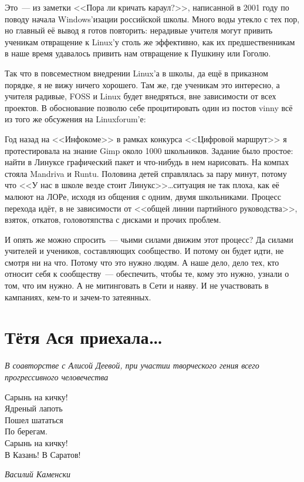 Это~--- из заметки <<Пора ли кричать караул?>>, написанной в 2001 году по поводу начала Windows'изации российской школы. Много воды утекло с тех пор, но главный её вывод я готов повторить: нерадивые учителя могут привить ученикам отвращение к Linux'у столь же эффективно, как их предшественникам в наше время удавалось привить нам отвращение к Пушкину или Гоголю.

Так что в повсеместном внедрении Linux'а в школы, да ещё в приказном порядке, я не вижу ничего хорошего. Там же, где ученикам это интересно, а учителя радивые, FOSS и Linux будет внедряться, вне зависимости от всех проектов. В обоснование позволю себе процитировать один из постов vinny всё из того же обсужения на Linuxforum'е:


\begin{shadequote}{}
Год назад на <<Инфокоме>> в рамках конкурса <<Цифровой маршрут>> я протестировала на знание Gimp около 1000 школьников. Задание было простое: найти в Линуксе графический пакет и что-нибудь в нем нарисовать. На компах стояла Mandriva и Runtu. Половина детей справлялась за пару минут, потому что <<У нас в школе везде стоит Линукс>>\dots ситуация не так плоха, как её малюют на ЛОРе, исходя из общения с одним, двумя школьниками. Процесс перехода идёт, в не зависимости от <<общей линии партийного руководства>>, взяток, откатов, головотяпства с дисками и прочих проблем.
\end{shadequote}

И опять же можно спросить~--- чьими силами движим этот процесс? Да силами учителей и учеников, составляющих сообщество. И потому он будет идти, не смотря ни на что. Потому что это нужно людям. А наше дело, дело тех, кто относит себя к сообществу~--- обеспечить, чтобы те, кому это нужно, узнали о том, что им нужно. А не митинговать в Сети и наяву. И не участвовать в кампаниях, кем-то и зачем-то затеянных.

\section{Тётя Ася приехала\dots} 
\textsl{В соавторстве с Алисой Деевой, при участии творческого гения всего прогрессивного человечества}

\hfill \begin{minipage}[h]{0.45\textwidth}
Сарынь на кичку!\\
Ядреный лапоть\\
Пошел шататься \\
По берегам.  \\
Сарынь на кичку!\\
В Казань!  В Саратов!
\begin{flushright}
\textit{Василий Каменски}
\end{flushright}
\bigskip\end{minipage}
  
